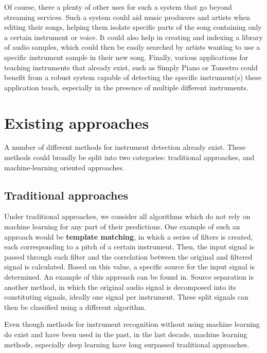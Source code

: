 Of course, there a plenty of other uses for such a system that go beyond streaming services. Such a system could aid music producers and artists when editing their songs, helping them isolate specific parts of the song containing only a certain instrument or voice. It could also help in creating and indexing a library of audio samples, which could then be easily searched by artists wanting to use a specific instrument sample in their new song. Finally, various applications for teaching instruments that already exist, such as Simply Piano \space \space or Tonestro \space \space could benefit from a robust system capable of detecting the specific instrument(s) these application teach, especially in the presence of multiple different instruments.

\section{Existing approaches}

A number of different methods for instrument detection already exist. These methods could broadly be split into two categories: traditional approaches, and machine-learning oriented approaches.

\subsection{Traditional approaches}

Under traditional approaches, we consider all algorithms which do not rely on machine learning for any part of their predictions. One example of such an approach would be \textbf{template matching}, in which a series of filters is created, each corresponding to a pitch of a certain instrument. Then, the input signal is passed through each filter and the correlation between the original and filtered signal is calculated. Based on this value, a specific source for the input signal is determined. An example of this approach can be found in\cite{kashinoetal}. Source separation is another method, in which the original audio signal is decomposed into its constituting signals, ideally one signal per instrument. These split signals can then be classified using a different algorithm.

Even though methods for instrument recognition without using machine learning do exist and have been used in the past, in the last decade, machine learning methods, especially deep learning have long surpassed traditional approaches.

